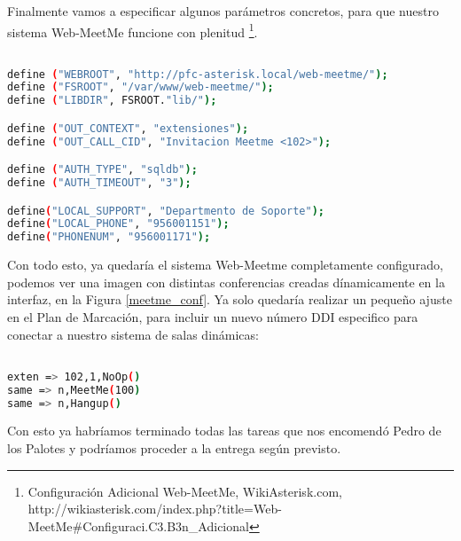 Finalmente vamos a especificar algunos parámetros concretos, para que nuestro sistema Web-MeetMe funcione con plenitud \footnote{Configuración Adicional Web-MeetMe, WikiAsterisk.com, \\ http://wikiasterisk.com/index.php?title=Web-MeetMe\#Configuraci.C3.B3n\_Adicional}.

\begin{lstlisting}[language=bash,title={/var/www/web-meetme/lib/defines.php}]

define ("WEBROOT", "http://pfc-asterisk.local/web-meetme/");
define ("FSROOT", "/var/www/web-meetme/");
define ("LIBDIR", FSROOT."lib/");

define ("OUT_CONTEXT", "extensiones");
define ("OUT_CALL_CID", "Invitacion Meetme <102>");

define ("AUTH_TYPE", "sqldb");
define ("AUTH_TIMEOUT", "3");

define("LOCAL_SUPPORT", "Departmento de Soporte");
define("LOCAL_PHONE", "956001151");
define("PHONENUM", "956001171");

\end{lstlisting}

Con todo esto, ya quedaría el sistema Web-Meetme completamente configurado, podemos ver una imagen con distintas conferencias creadas dínamicamente en la interfaz, en la Figura \ref{meetme_conf}. Ya solo quedaría realizar un pequeño ajuste en el Plan de Marcación, para incluir un nuevo número DDI especifico para conectar a nuestro sistema de salas dinámicas:


\begin{lstlisting}[language=bash,title={/etc/asterisk/extensions.conf}]

exten => 102,1,NoOp()
same => n,MeetMe(100)
same => n,Hangup()

\end{lstlisting}

Con esto ya habríamos terminado todas las tareas que nos encomendó Pedro de los Palotes y podríamos proceder a la entrega según previsto.


